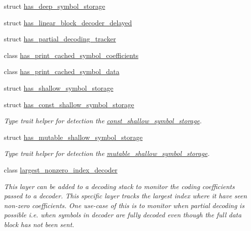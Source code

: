 \begin{DoxyCompactItemize}
\item 
struct \hyperlink{structkodo_1_1has__deep__symbol__storage}{has\-\_\-deep\-\_\-symbol\-\_\-storage}
\item 
struct \hyperlink{structkodo_1_1has__linear__block__decoder__delayed}{has\-\_\-linear\-\_\-block\-\_\-decoder\-\_\-delayed}
\item 
struct \hyperlink{structkodo_1_1has__partial__decoding__tracker}{has\-\_\-partial\-\_\-decoding\-\_\-tracker}
\item 
class \hyperlink{classkodo_1_1has__print__cached__symbol__coefficients}{has\-\_\-print\-\_\-cached\-\_\-symbol\-\_\-coefficients}
\item 
class \hyperlink{classkodo_1_1has__print__cached__symbol__data}{has\-\_\-print\-\_\-cached\-\_\-symbol\-\_\-data}
\item 
struct \hyperlink{structkodo_1_1has__shallow__symbol__storage}{has\-\_\-shallow\-\_\-symbol\-\_\-storage}
\item 
struct \hyperlink{structkodo_1_1has__const__shallow__symbol__storage}{has\-\_\-const\-\_\-shallow\-\_\-symbol\-\_\-storage}
\begin{DoxyCompactList}\small\item\em Type trait helper for detection the \hyperlink{classkodo_1_1const__shallow__symbol__storage}{const\-\_\-shallow\-\_\-symbol\-\_\-storage}. \end{DoxyCompactList}\item 
struct \hyperlink{structkodo_1_1has__mutable__shallow__symbol__storage}{has\-\_\-mutable\-\_\-shallow\-\_\-symbol\-\_\-storage}
\begin{DoxyCompactList}\small\item\em Type trait helper for detection the \hyperlink{classkodo_1_1mutable__shallow__symbol__storage}{mutable\-\_\-shallow\-\_\-symbol\-\_\-storage}. \end{DoxyCompactList}\item 
class \hyperlink{classkodo_1_1largest__nonzero__index__decoder}{largest\-\_\-nonzero\-\_\-index\-\_\-decoder}
\begin{DoxyCompactList}\small\item\em This layer can be added to a decoding stack to monitor the coding coefficients passed to a decoder. This specific layer tracks the largest index where it have seen non-\/zero coefficients. One use-\/case of this is to monitor when partial decoding is possible i.\-e. when symbols in decoder are fully decoded even though the full data block has not been sent. \end{DoxyCompactList}\item 

\end{DoxyCompactItemize}
